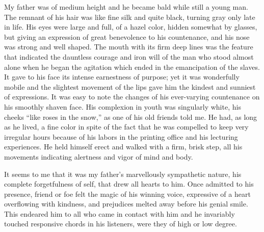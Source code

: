 \documentclass{book}
\begin{document}
My father was of medium height and he became bald while still a young man. The remnant of his hair was like fine silk and quite black, turning gray only late in life. His eyes were large and full, of a hazel color, hidden somewhat by glasses, but giving an expression of great benevolence to his countenance, and his nose was strong and well shaped. The mouth with its firm deep lines was the feature that indicated the dauntless courage and iron will of the man who stood almost alone when he began the agitation which ended in the emancipation of the slaves. It gave to his face its intense earnestness of purpose; yet it was wonderfully mobile and the slightest movement of the lips gave him the kindest and sunniest of expressions. It was easy to note the changes of his ever-varying countenance on his smoothly shaven face. His complexion in youth was singularly white, his cheeks “like roses in the snow,” as one of his old friends told me. He had, as long as he lived, a fine color in spite of the fact that he was compelled to keep very irregular hours because of his labors in the printing office and his lecturing experiences. He held himself erect and walked with a firm, brisk step, all his movements indicating alertness and vigor of mind and body.

It seems to me that it was my father’s marvellously sympathetic nature, his complete forgetfulness of self, that drew all hearts to him. Once admitted to his presence, friend or foe felt the magic of his winning voice, expressive of a heart overflowing with kindness, and prejudices melted away before his genial smile. This endeared him to all who came in contact with him and he invariably touched responsive chords in his listeners, were they of high or low degree.
\end{document}
